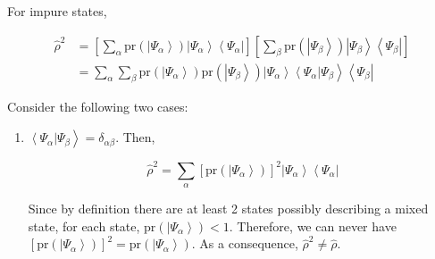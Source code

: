 \documentclass[9pt,handout]{beamer}
\newcommand{\pr}[0]{\text{pr}}
\begin{document}
\begin{frame}{}
For impure states,

\begin{align*}
\widehat{\rho}^2 & = \left[ \sum_{\alpha} \pr \left( \left\lvert \Psi_\alpha \right\rangle \right) \left\lvert \Psi_\alpha \right\rangle \left\langle \Psi_\alpha \right\rvert \right] \left[ \sum_{\beta} \pr \left( \left\lvert \Psi_\beta \right\rangle \right) \left\lvert \Psi_\beta \right\rangle \left\langle \Psi_\beta \right\rvert \right] \\
& = \sum_\alpha \sum_\beta \pr \left( \left\lvert \Psi_\alpha \right\rangle \right) \pr \left( \left\lvert \Psi_\beta \right\rangle \right) \left\lvert \Psi_\alpha \right\rangle \left\langle \Psi_\alpha \right\rvert \left. \Psi_\beta \right\rangle \left\langle \Psi_\beta \right\rvert
\end{align*}

Consider the following two cases:

\begin{enumerate}
\item $\left\langle \Psi_\alpha \right\rvert \left. \Psi_\beta \right\rangle = \delta_{\alpha \beta}$. Then, 

$$\widehat{\rho}^2 = \sum_\alpha \left[ \pr \left( \left\lvert \Psi_\alpha \right\rangle \right) \right]^2 \left\lvert \Psi_\alpha \right\rangle \left\langle \Psi_\alpha \right\rvert$$

Since by definition there are at least 2 states possibly describing a mixed state, for each state, $\pr \left( \left\lvert \Psi_\alpha \right\rangle \right) < 1$. Therefore, we can never have $\left[ \pr \left( \left\lvert \Psi_\alpha \right\rangle \right) \right]^2 = \pr \left( \left\lvert \Psi_\alpha \right\rangle \right)$. As a consequence, $\widehat{\rho}^2 \neq \widehat{\rho}$.
\end{enumerate}
\end{frame}
\end{document}
